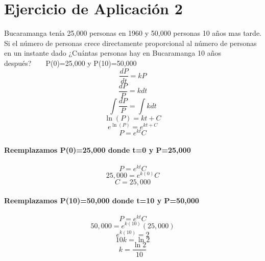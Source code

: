 \documentclass{article}
\begin{document}
\section{Ejercicio de Aplicación 2}
Bucaramanga tenía 25,000 personas en 1960 y 50,000 personas 10 años mas tarde. Si el número de personas crece directamente proporcional al número de personas en un instante dado ¿Cuántas personas hay en Bucaramanga 10 años después?\ \ 
\ \ P(0)=25,000 y P(10)=50,000
\begin{equation}
\frac{dP}{dt}=kP 
\end{equation}
\begin{equation}
\frac{dP}{P}=k{dt}
\end{equation}
\begin{equation}
\int\frac{dP}{P}=\int{k{dt}}
\end{equation}
\begin{equation}
\ln{(P)}={kt} + C
\end{equation}
\begin{equation}
e^{\ln{(P)}}=e^{kt + C}
\end{equation}
\begin{equation}
P=e^{kt}C
\end{equation}
\paragraph{Reemplazamos P(0)=25,000 donde t=0 y P=25,000} 
\begin{equation}
P=e^{kt}C
\end{equation}
\begin{equation}
25,000=e^{k(0)}C
\end{equation}
\begin{equation}
C=25,000
\end{equation}
\paragraph{Reemplazamos P(10)=50,000 donde t=10 y P=50,000} 
\begin{equation}
P=e^{kt}C
\end{equation}
\begin{equation}
50,000=e^{k(10)}(25,000)
\end{equation}
\begin{equation}
e^{k(10)}=2
\end{equation}
\begin{equation}
10k=\ln{2}
\end{equation}
\begin{equation}
k=\frac{\ln{2}}{10}
\end{equation}
\end{document}
